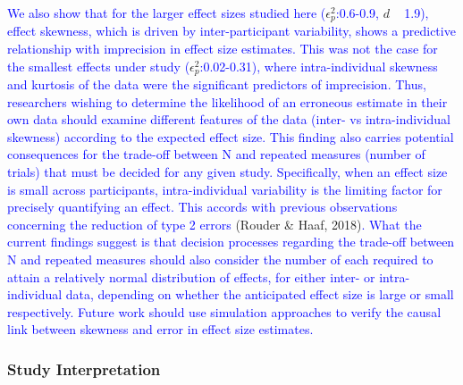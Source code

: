 \documentclass[
  man]{apa6}
\begin{document}
\textcolor{blue}{We also show that for the larger effect sizes studied here (}\(\epsilon_{p}^2\)\textcolor{blue}{:0.6-0.9,} \(d\) \textcolor{blue}{~ 1.9), effect skewness, which is driven by inter-participant variability, shows a predictive relationship with imprecision in effect size estimates. This was not the case for the smallest effects under study (}\(\epsilon_{p}^2\)\textcolor{blue}{:0.02-0.31), where intra-individual skewness and kurtosis of the data were the significant predictors of imprecision. Thus, researchers wishing to determine the likelihood of an erroneous estimate in their own data should examine different features of the data (inter- vs intra-individual skewness) according to the expected effect size. This finding also carries potential consequences for the trade-off between N and repeated measures (number of trials) that must be decided for any given study. Specifically, when an effect size is small across participants, intra-individual variability is the limiting factor for precisely quantifying an effect. This accords with previous observations concerning the reduction of type 2 errors} (Rouder \& Haaf, 2018)\textcolor{blue}{. What the current findings suggest is that decision processes regarding the trade-off between N and repeated measures should also consider the number of each required to attain a relatively normal distribution of effects, for either inter- or intra-individual data, depending on whether the anticipated effect size is large or small respectively. Future work should use simulation approaches to verify the causal link between skewness and error in effect size estimates.}

\hypertarget{study-interpretation}{%
\subsubsection{Study Interpretation}\label{study-interpretation}}
\end{document}
